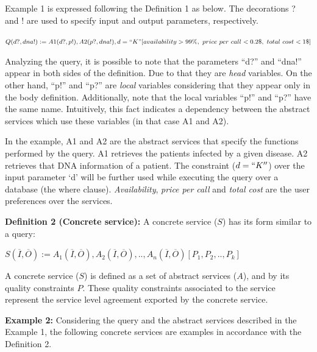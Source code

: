 \documentclass[12pt,a4paper,oneside]{article}
\begin{document}
Example 1 is expressed following the Definition 1 as below.
The decorations ? and ! are used to specify input and output parameters, respectively. 

\begin{center}
$Q (d?, dna!) := A1(d?, p!), A2(p?, dna!),d = ``K"[availability > 99\%, \ price \ per \ call < 0.2\$, \ total \ cost < 1\$]$
\end{center}  

Analyzing the query, it is possible to note that the parameters ``d?'' and ``dna!'' appear in both sides of the definition.
Due to that they are \textit{head} variables.
On the other hand, ``p!'' and ``p?'' are \textit{local} variables considering that they appear only in the body definition. 
Additionally, note that the local variables ``p!'' and ``p?'' have the same name.
Intuitively, this fact indicates a dependency between the abstract services which use these variables (in that case A1 and A2).

In the example, A1 and A2 are the abstract services that specify the functions performed by the query. 
A1 retrieves the patients infected by a given disease.
A2 retrieves that DNA information of a patient.
The constraint ($d = ``K''$) over the input parameter `d' will be further used while executing the query over a database (the where clause). 
\textit{Availability}, \textit{price per call} and \textit{total cost} are the user preferences over the services.

\noindent \textbf{Definition 2 (Concrete service):} A concrete service ($S$) has its form similar to a query:
\begin{center}
$S (\overline{I}, \overline{O}) := A_{1}(\overline{I}, \overline{O}), A_{2}(\overline{I}, \overline{O}), ..,  A_{n}(\overline{I}, \overline{O})[P_{1},P_{2}, .., P_{k}]$
\end{center}  
A concrete service ($S$) is defined as a set of abstract services ($A$), and by its quality constraints $P$. 
These quality constraints associated to the service represent the service level agreement exported by the concrete service.

\noindent \textbf{Example 2:} Considering the query and the abstract services described in the Example 1, the following concrete services are examples in accordance with the Definition 2.
\end{document}
